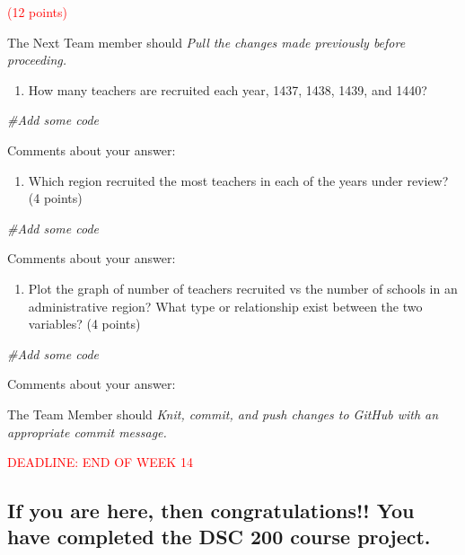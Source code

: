 \documentclass[
]{article}
\newenvironment{Shaded}{\begin{snugshade}}{\end{snugshade}}
\newcommand{\CommentTok}[1]{\textcolor[rgb]{0.56,0.35,0.01}{\textit{#1}}}
\providecommand{\tightlist}{%
  \setlength{\itemsep}{0pt}\setlength{\parskip}{0pt}}
\begin{document}
\textcolor{red}{(12 points)}

The Next Team member should \emph{Pull the changes made previously
before proceeding.}

\begin{enumerate}
\def\labelenumi{(\alph{enumi})}
\tightlist
\item
  How many teachers are recruited each year, 1437, 1438, 1439, and 1440?
\end{enumerate}

\begin{Shaded}
\begin{Highlighting}[]
\CommentTok{\#Add some code}
\end{Highlighting}
\end{Shaded}

Comments about your answer:

\begin{enumerate}
\def\labelenumi{(\alph{enumi})}
\setcounter{enumi}{1}
\tightlist
\item
  Which region recruited the most teachers in each of the years under
  review? (4 points)
\end{enumerate}

\begin{Shaded}
\begin{Highlighting}[]
\CommentTok{\#Add some code}
\end{Highlighting}
\end{Shaded}

Comments about your answer:

\begin{enumerate}
\def\labelenumi{(\alph{enumi})}
\setcounter{enumi}{2}
\tightlist
\item
  Plot the graph of number of teachers recruited vs the number of
  schools in an administrative region? What type or relationship exist
  between the two variables? (4 points)
\end{enumerate}

\begin{Shaded}
\begin{Highlighting}[]
\CommentTok{\#Add some code}
\end{Highlighting}
\end{Shaded}

Comments about your answer:

The Team Member should \emph{Knit, commit, and push changes to GitHub
with an appropriate commit message.}

\textcolor{red}{DEADLINE: END OF WEEK 14}

\hypertarget{if-you-are-here-then-congratulations-you-have-completed-the-dsc-200-course-project.}{%
\subsection{If you are here, then congratulations!! You have completed
the DSC 200 course
project.}\label{if-you-are-here-then-congratulations-you-have-completed-the-dsc-200-course-project.}}
\end{document}
